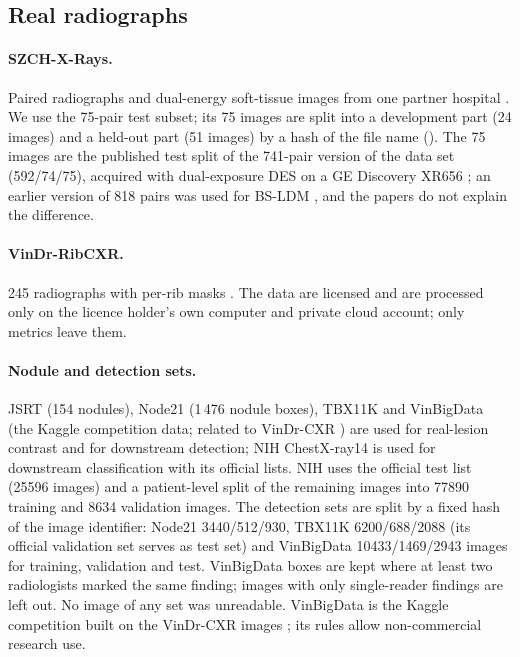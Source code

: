 \subsection{Real radiographs}
\paragraph{SZCH-X-Rays.} Paired radiographs and dual-energy soft-tissue images from one partner hospital \citep{sun2026bsldm,sun2026debonedit}. We use the
75-pair test subset; its 75 images are split into a development part (24 images) and a held-out part (51 images) by a hash of the file name
(). The 75 images are the published test split of the 741-pair version of the data set (592/74/75), acquired with dual-exposure DES on a GE
Discovery XR656 \citep{sun2026debonedit}; an earlier version of 818 pairs was used for BS-LDM \citep{sun2026bsldm}, and the papers do not
explain the difference.

\paragraph{VinDr-RibCXR.} 245 radiographs with per-rib masks \citep{nguyen2021ribcxr}. The data are licensed and are processed only on the licence
holder's own computer and private cloud account; only metrics leave them.

\paragraph{Nodule and detection sets.} JSRT \citep{shiraishi2000jsrt} (154 nodules), Node21 \citep{sogancioglu2024node21} (1\,476 nodule boxes),
TBX11K \citep{liu2020tbx11k} and VinBigData (the Kaggle competition data; related to VinDr-CXR \citep{nguyen2022vindrcxr}) are used for real-lesion contrast
and for downstream detection; NIH ChestX-ray14 \citep{wang2017chestxray} is used for downstream classification with its official lists.
NIH uses the official test list (\num{25596} images) and a patient-level split of the remaining images into \num{77890} training and \num{8634}
validation images. The detection sets are split by a fixed hash of the image identifier: Node21 \num{3440}/\num{512}/\num{930}, TBX11K
\num{6200}/\num{688}/\num{2088} (its official validation set serves as test set) and VinBigData \num{10433}/\num{1469}/\num{2943} images for
training, validation and test. VinBigData boxes are kept where at least two radiologists marked the same finding; images with only single-reader
findings are left out. No image of any set was unreadable. VinBigData is the Kaggle competition built on the VinDr-CXR images \citep{vinbigdata2020kaggle}; its rules allow non-commercial research use.

